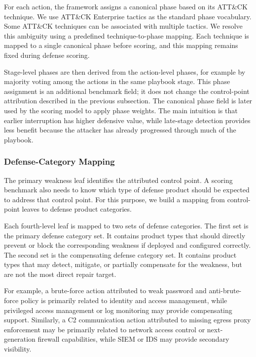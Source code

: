 For each action, the framework assigns a canonical phase based on its ATT\&CK technique. We use ATT\&CK Enterprise tactics as the standard phase vocabulary. Some ATT\&CK techniques can be associated with multiple tactics. We resolve this ambiguity using a predefined technique-to-phase mapping. Each technique is mapped to a single canonical phase before scoring, and this mapping remains fixed during defense scoring.

Stage-level phases are then derived from the action-level phases, for example by majority voting among the actions in the same playbook stage. This phase assignment is an additional benchmark field; it does not change the control-point attribution described in the previous subsection. The canonical phase field is later used by the scoring model to apply phase weights. The main intuition is that earlier interruption has higher defensive value, while late-stage detection provides less benefit because the attacker has already progressed through much of the playbook.

\subsubsection{Defense-Category Mapping}

The primary weakness leaf identifies the attributed control point. A scoring benchmark also needs to know which type of defense product should be expected to address that control point. For this purpose, we build a mapping from control-point leaves to defense product categories.

Each fourth-level leaf is mapped to two sets of defense categories. The first set is the primary defense category set. It contains product types that should directly prevent or block the corresponding weakness if deployed and configured correctly. The second set is the compensating defense category set. It contains product types that may detect, mitigate, or partially compensate for the weakness, but are not the most direct repair target.

For example, a brute-force action attributed to weak password and anti-brute-force policy is primarily related to identity and access management, while privileged access management or log monitoring may provide compensating support. Similarly, a C2 communication action attributed to missing egress proxy enforcement may be primarily related to network access control or next-generation firewall capabilities, while SIEM or IDS may provide secondary visibility.

